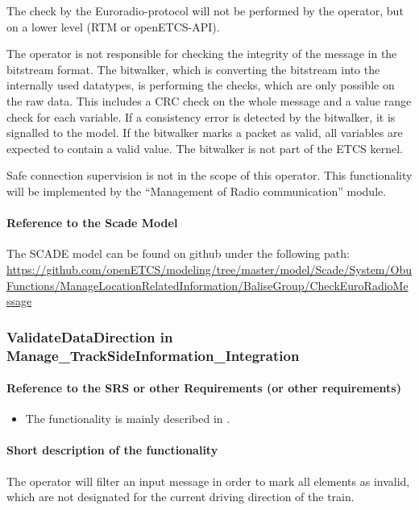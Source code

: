 The check by the Euroradio-protocol \cite[3.16.3.1.1]{subset-026} will not be performed by the operator, but on a lower level (RTM or openETCS-API).

The operator is not responsible for checking the integrity of the message in the bitstream format. The bitwalker, which is converting the bitstream into the internally used datatypes, is performing the checks, which are only possible on the raw data. This includes a CRC check on the whole message and a value range check for each variable. If a consistency error is detected by the bitwalker, it is signalled to the model. If the bitwalker marks a packet as valid, all variables are expected to contain a valid value. The bitwalker is not part of the ETCS kernel.

Safe connection supervision is not in the scope of this operator. This functionality will be implemented by the ``Management of Radio communication'' module.

\paragraph{Reference to the Scade Model}
The SCADE model can be found on github under the following path: \url{https://github.com/openETCS/modeling/tree/master/model/Scade/System/ObuFunctions/ManageLocationRelatedInformation/BaliseGroup/CheckEuroRadioMessage}


\subsubsection{ValidateDataDirection in Manage\_TrackSideInformation\_Integration}

\paragraph{Reference to the SRS or other Requirements (or other requirements)}
\begin{itemize}
 \item The functionality is mainly described in \cite[Chapter~3.6.3]{subset-026}.
\end{itemize}

\paragraph{Short description of the functionality}
The operator will filter an input message in order to mark all elements as invalid, which are not designated for the current driving direction of the train.


